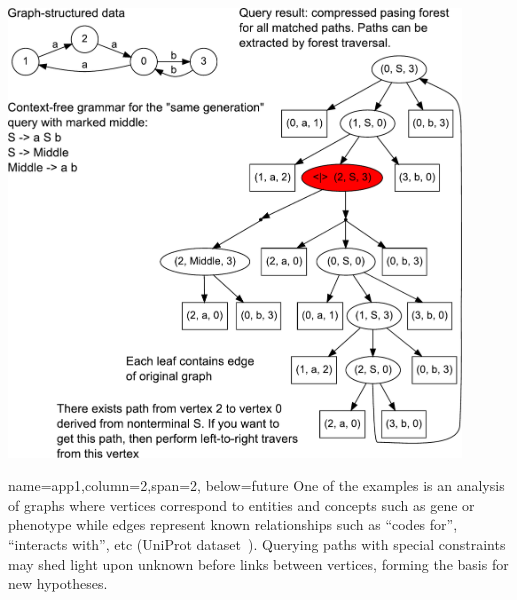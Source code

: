 \documentclass[a0paper,portrait]{baposter}
\begin{document}
\begin{poster}
{\begin{center}
\includegraphics[width=0.9\textwidth]{AnBn_r.pdf}
\end{center}
}

{name=app1,column=2,span=2, below=future}
{ %
One of the examples is an analysis of graphs where vertices correspond to entities and concepts such as gene or phenotype while edges represent known relationships such as ``codes for'', ``interacts with'', etc (UniProt dataset~\cite{UniProt}).
Querying paths with special constraints may shed light upon unknown before links between vertices, forming the basis for new hypotheses.
}



\end{poster}
\end{document}
